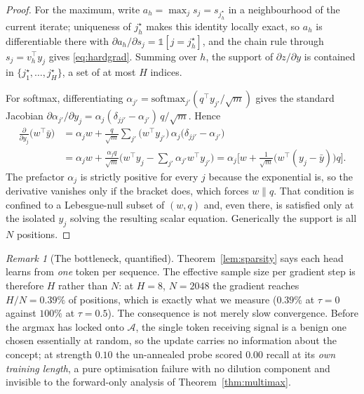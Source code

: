 \documentclass[10pt]{article}
\theoremstyle{plain}
\theoremstyle{definition}
\theoremstyle{remark}
\newtheorem{remark}[theorem]{Remark}
\begin{document}
\begin{proof}
For the maximum, write $a_h=\max_j s_j = s_{j^\star_h}$ in a neighbourhood of the current
iterate; uniqueness of $j^\star_h$ makes this identity locally exact, so $a_h$ is
differentiable there with $\partial a_h/\partial s_j = \mathbb{1}[j=j^\star_h]$, and the
chain rule through $s_j = v_h^\top y_j$ gives \eqref{eq:hardgrad}. Summing over $h$, the
support of $\partial z/\partial y$ is contained in $\{j^\star_1,\dots,j^\star_H\}$, a set
of at most $H$ indices.

For softmax, differentiating $\alpha_{j'}=\mathrm{softmax}_{j'}(q^\top y_{j'}/\sqrt m)$
gives the standard Jacobian
$\partial\alpha_{j'}/\partial y_j=\alpha_j(\delta_{jj'}-\alpha_{j'})\,q/\sqrt m$. Hence
\begin{align}
  \frac{\partial}{\partial y_j}\big(w^\top\bar y\big)
  &= \alpha_j w
     + \frac{q}{\sqrt m}\sum_{j'}\big(w^\top y_{j'}\big)\,
       \alpha_j\big(\delta_{jj'}-\alpha_{j'}\big) \nonumber\\
  &= \alpha_j w
     + \frac{\alpha_j q}{\sqrt m}\Big(w^\top y_j-\textstyle\sum_{j'}\alpha_{j'}w^\top y_{j'}\Big)
   = \alpha_j\Big[w+\tfrac{1}{\sqrt m}\big(w^\top(y_j-\bar y)\big)q\Big].
\end{align}
The prefactor $\alpha_j$ is strictly positive for every $j$ because the exponential is,
so the derivative vanishes only if the bracket does, which forces $w\parallel q$. That
condition is confined to a Lebesgue-null subset of $(w,q)$ and, even there, is satisfied
only at the isolated $y_j$ solving the resulting scalar equation. Generically the support is all
$N$ positions.
\end{proof}

\begin{remark}[The bottleneck, quantified]
\label{rem:sparsity}
Theorem~\ref{lem:sparsity} says each head learns from \emph{one} token per sequence. The
effective sample size per gradient step is therefore $H$ rather than $N$: at $H{=}8$,
$N{=}2048$ the gradient reaches $H/N=0.39\%$ of positions, which is exactly what we
measure ($0.39\%$ at $\tau{=}0$ against $100\%$ at $\tau{=}0.5$). The consequence is not
merely slow convergence. Before the argmax has locked onto $\mathcal{A}$, the single token
receiving signal is a benign one chosen essentially at random, so the update carries no
information about the concept; at strength $0.10$ the un-annealed probe scored $0.00$
recall at its \emph{own training length}, a pure optimisation failure with no dilution
component and invisible to the forward-only analysis of Theorem~\ref{thm:multimax}.
\end{remark}
\end{document}
